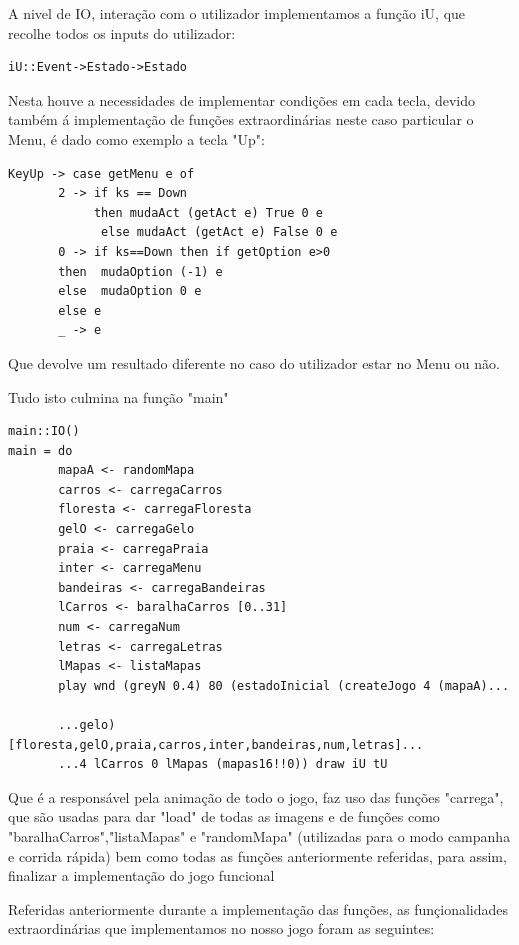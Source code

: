 \documentclass[a4paper]{report} %
\begin{document}
A nivel de IO, interação com o utilizador implementamos a função iU, que recolhe todos os inputs do utilizador:

\begin{verbatim}
iU::Event->Estado->Estado
\end{verbatim}
Nesta houve a necessidades de implementar condições em cada tecla, devido também á implementação de funções extraordinárias neste caso particular o Menu, é dado como exemplo a tecla "Up":
\begin{verbatim}
KeyUp -> case getMenu e of
       2 -> if ks == Down
            then mudaAct (getAct e) True 0 e
             else mudaAct (getAct e) False 0 e
       0 -> if ks==Down then if getOption e>0
       then  mudaOption (-1) e
       else  mudaOption 0 e
       else e
       _ -> e
\end{verbatim}
Que devolve um resultado diferente no caso do utilizador estar no Menu ou não.

Tudo isto culmina na função "main"
\begin{verbatim}
main::IO()
main = do 
       mapaA <- randomMapa 
       carros <- carregaCarros
       floresta <- carregaFloresta
       gelO <- carregaGelo
       praia <- carregaPraia
       inter <- carregaMenu
       bandeiras <- carregaBandeiras
       lCarros <- baralhaCarros [0..31]
       num <- carregaNum
       letras <- carregaLetras
       lMapas <- listaMapas
       play wnd (greyN 0.4) 80 (estadoInicial (createJogo 4 (mapaA)... 
       
       ...gelo) [floresta,gelO,praia,carros,inter,bandeiras,num,letras]... 
       ...4 lCarros 0 lMapas (mapas16!!0)) draw iU tU
\end{verbatim}
Que é a responsável pela animação de todo o jogo, faz uso das funções "carrega", que são usadas para dar "load" de todas as imagens e de funções como "baralhaCarros","listaMapas" e "randomMapa" (utilizadas para o modo campanha e corrida rápida) bem como todas as funções anteriormente referidas, para assim, finalizar a implementação do jogo funcional

Referidas anteriormente durante a implementação das funções, as funçionalidades extraordinárias que implementamos no nosso jogo foram as seguintes: 
\end{document}
